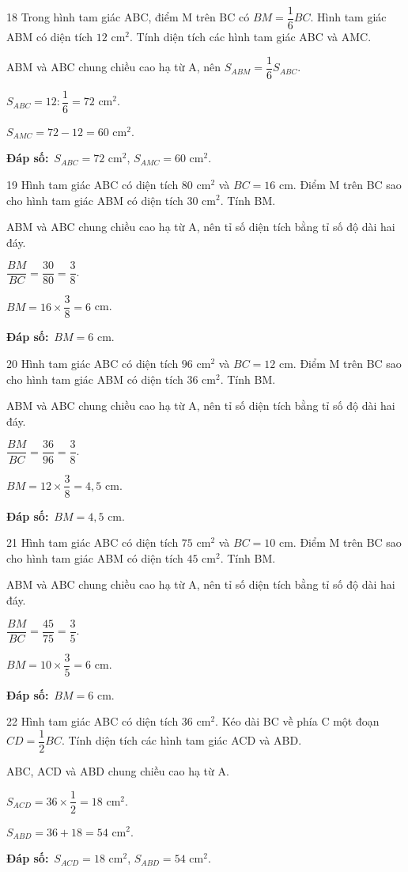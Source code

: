 \documentclass[11pt]{article}
\newif\ifsol \solfalse
\providecommand{\AnsWord}{Đáp số}
\newcommand{\dapso}[1]{\par\textbf{\AnsWord:}\ #1}
\newcommand{\probsol}[1]{%
  \begin{lrbox}{\solmeasure}\begin{minipage}{\dimexpr\linewidth-24pt\relax}#1\end{minipage}\end{lrbox}%
  \ifsol
    \begin{solbox}#1\end{solbox}%
  \else
    \setlength{\solht}{\dimexpr\ht\solmeasure+\dp\solmeasure+0.85cm\relax}%
    \ifdim\solht<1.35cm\setlength{\solht}{1.35cm}\fi
    \begin{tcolorbox}[colback=white,colframe=Line,boxrule=0.8pt,arc=5pt,
      left=8pt,right=8pt,top=4pt,bottom=4pt,height=\solht]{\footnotesize\color{Slate}\itshape\WorkWord}\end{tcolorbox}%
  \fi}
\newcommand{\gap}{\vspace{0.3cm}}
\def\WorkWord{Bài làm:}
\def\AnsWord{Đáp số}
\begin{document}
\gap
\begin{probbox}{18}{\relax}
Trong hình tam giác ABC, điểm M trên BC có $BM=\dfrac{1}{6}BC$. Hình tam giác ABM có diện tích $12$ cm$^2$. Tính diện tích các hình tam giác ABC và AMC.
\end{probbox}
\probsol{
ABM và ABC chung chiều cao hạ từ A, nên $S_{ABM}=\dfrac{1}{6}S_{ABC}$.\par $S_{ABC}=12:\dfrac{1}{6}=72$ cm$^2$.\par $S_{AMC}=72-12=60$ cm$^2$.
\dapso{$S_{ABC}=72$ cm$^2$, $S_{AMC}=60$ cm$^2$.}}
\gap
\begin{probbox}{19}{\relax}
Hình tam giác ABC có diện tích $80$ cm$^2$ và $BC=16$ cm. Điểm M trên BC sao cho hình tam giác ABM có diện tích $30$ cm$^2$. Tính BM.
\end{probbox}
\probsol{
ABM và ABC chung chiều cao hạ từ A, nên tỉ số diện tích bằng tỉ số độ dài hai đáy.\par $\dfrac{BM}{BC}=\dfrac{30}{80}=\dfrac{3}{8}$.\par $BM=16\times\dfrac{3}{8}=6$ cm.
\dapso{$BM=6$ cm.}}
\gap
\begin{probbox}{20}{\relax}
Hình tam giác ABC có diện tích $96$ cm$^2$ và $BC=12$ cm. Điểm M trên BC sao cho hình tam giác ABM có diện tích $36$ cm$^2$. Tính BM.
\end{probbox}
\probsol{
ABM và ABC chung chiều cao hạ từ A, nên tỉ số diện tích bằng tỉ số độ dài hai đáy.\par $\dfrac{BM}{BC}=\dfrac{36}{96}=\dfrac{3}{8}$.\par $BM=12\times\dfrac{3}{8}=4{,}5$ cm.
\dapso{$BM=4{,}5$ cm.}}
\gap
\begin{probbox}{21}{\relax}
Hình tam giác ABC có diện tích $75$ cm$^2$ và $BC=10$ cm. Điểm M trên BC sao cho hình tam giác ABM có diện tích $45$ cm$^2$. Tính BM.
\end{probbox}
\probsol{
ABM và ABC chung chiều cao hạ từ A, nên tỉ số diện tích bằng tỉ số độ dài hai đáy.\par $\dfrac{BM}{BC}=\dfrac{45}{75}=\dfrac{3}{5}$.\par $BM=10\times\dfrac{3}{5}=6$ cm.
\dapso{$BM=6$ cm.}}
\gap
\begin{probbox}{22}{\relax}
Hình tam giác ABC có diện tích $36$ cm$^2$. Kéo dài BC về phía C một đoạn $CD=\dfrac12BC$. Tính diện tích các hình tam giác ACD và ABD.
\end{probbox}
\probsol{
ABC, ACD và ABD chung chiều cao hạ từ A.\par $S_{ACD}=36\times\dfrac{1}{2}=18$ cm$^2$.\par $S_{ABD}=36+18=54$ cm$^2$.
\dapso{$S_{ACD}=18$ cm$^2$, $S_{ABD}=54$ cm$^2$.}}
\end{document}
